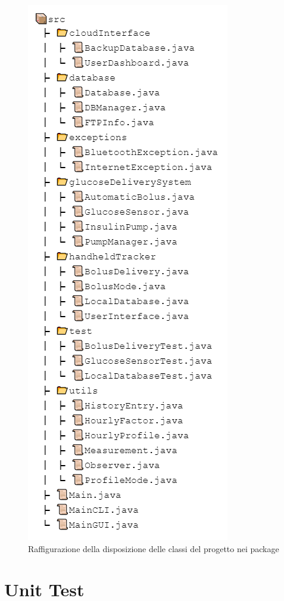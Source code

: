 \documentclass[twocolumn]{article}
\begin{document}
\vspace{1.5em}
\begin{figure}[H]
    \centering
    \captionsetup{justification=centering,margin=2cm}
    \includegraphics{FileTree.png}
    \caption{Raffigurazione della disposizione delle classi del progetto nei package}
    \label{fig:packages}
\end{figure}

\newpage

\section{Unit Test}
\end{document}
